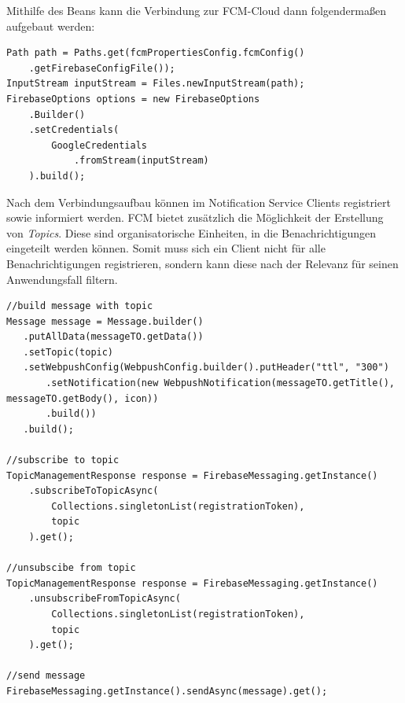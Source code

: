 Mithilfe des Beans kann die Verbindung zur \ac{FCM}-Cloud dann folgendermaßen aufgebaut werden:

\begin{lstlisting}[caption={Firebase Service Account Bean}]
Path path = Paths.get(fcmPropertiesConfig.fcmConfig()
    .getFirebaseConfigFile());
InputStream inputStream = Files.newInputStream(path);
FirebaseOptions options = new FirebaseOptions
    .Builder()
    .setCredentials(
        GoogleCredentials
            .fromStream(inputStream)
    ).build();
\end{lstlisting}

Nach dem Verbindungsaufbau können im Notification Service Clients registriert sowie informiert werden. \ac{FCM} bietet zusätzlich die Möglichkeit der Erstellung von \textit{Topics}. Diese sind organisatorische Einheiten, in die Benachrichtigungen eingeteilt werden können. Somit muss sich ein Client nicht für alle Benachrichtigungen registrieren, sondern kann diese nach der Relevanz für seinen Anwendungsfall filtern.

\newpage
\begin{lstlisting}[caption={Firebase Service Account Bean}]
//build message with topic
Message message = Message.builder()
   .putAllData(messageTO.getData())
   .setTopic(topic)
   .setWebpushConfig(WebpushConfig.builder().putHeader("ttl", "300")
       .setNotification(new WebpushNotification(messageTO.getTitle(), messageTO.getBody(), icon))
       .build())
   .build();

//subscribe to topic
TopicManagementResponse response = FirebaseMessaging.getInstance()
    .subscribeToTopicAsync(
        Collections.singletonList(registrationToken), 
        topic
    ).get();

//unsubscibe from topic
TopicManagementResponse response = FirebaseMessaging.getInstance()
    .unsubscribeFromTopicAsync(
        Collections.singletonList(registrationToken), 
        topic
    ).get();

//send message
FirebaseMessaging.getInstance().sendAsync(message).get();

\end{lstlisting}